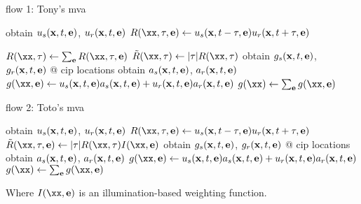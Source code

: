 \begin{frame}[fragile]{flow 1: Tony's mva}
    \begin{algorithm}[H]
        \begin{algorithmic}
                \STATE obtain $u_s({\bf x},t,{\bf e})$, $u_r({\bf x},t,{\bf e})$
                \STATE $R(\xx,\tau,{\bf e}) \leftarrow u_s({\bf x},t-\tau,{\bf e})u_r({\bf x},t+\tau,{\bf e})$

            \ENDFOR
            \STATE $R(\xx,\tau)\leftarrow \sum_{\bf e}R(\xx,\tau,{\bf e})$
            \STATE $\tilde{R}(\xx,\tau) \leftarrow |\tau|R(\xx,\tau)$
                \STATE obtain $g_s({\bf x},t,{\bf e})$, $g_r({\bf x},t,{\bf e})$ @ cip locations
                \STATE obtain $a_s({\bf x},t,{\bf e})$, $a_r({\bf x},t,{\bf e})$
                \STATE $g(\xx,{\bf e}) \leftarrow u_s({\bf x},t,{\bf e})a_s({\bf x},t,{\bf e})+u_r({\bf x},t,{\bf e})a_r({\bf x},t,{\bf e})$
            \ENDFOR
            \STATE  $g(\xx) \leftarrow \sum_{\bf e}g(\xx,{\bf e})$

        \end{algorithmic}
    \end{algorithm}
\end{frame}

\begin{frame}[fragile]{flow 2: Toto's mva}
    \begin{algorithm}[H]
        \begin{algorithmic}
                \STATE obtain $u_s({\bf x},t,{\bf e})$, $u_r({\bf x},t,{\bf e})$
                \STATE $R(\xx,\tau,{\bf e}) \leftarrow u_s({\bf x},t-\tau,{\bf e})u_r({\bf x},t+\tau,{\bf e})$
                \STATE $\tilde{R}(\xx,\tau,{\bf e}) \leftarrow |\tau|R(\xx,\tau) I(\xx,{\bf e})$
                \STATE obtain $g_s({\bf x},t,{\bf e})$, $g_r({\bf x},t,{\bf e})$ @ cip locations
                \STATE obtain $a_s({\bf x},t,{\bf e})$, $a_r({\bf x},t,{\bf e})$
                \STATE $g(\xx,{\bf e}) \leftarrow u_s({\bf x},t,{\bf e})a_s({\bf x},t,{\bf e})+u_r({\bf x},t,{\bf e})a_r({\bf x},t,{\bf e})$
            \ENDFOR
            \STATE  $g(\xx) \leftarrow \sum_{\bf e}g(\xx,{\bf e})$

        \end{algorithmic}
    \end{algorithm}
    Where $I(\xx,{\bf e})$ is an illumination-based weighting function.
\end{frame}

